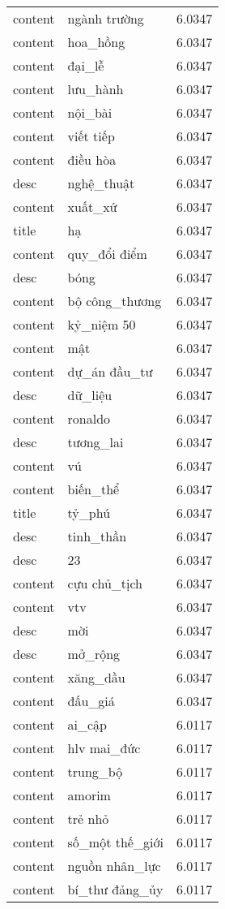 \documentclass{article}
\begin{document}
\begin{tabular}{lll}
content & ngành trường & 6.0347\\
content & hoa\_hồng & 6.0347\\
content & đại\_lễ & 6.0347\\
content & lưu\_hành & 6.0347\\
content & nội\_bài & 6.0347\\
content & viết tiếp & 6.0347\\
content & điều hòa & 6.0347\\
desc & nghệ\_thuật & 6.0347\\
content & xuất\_xứ & 6.0347\\
title & hạ & 6.0347\\
content & quy\_đổi điểm & 6.0347\\
desc & bóng & 6.0347\\
content & bộ công\_thương & 6.0347\\
content & kỷ\_niệm 50 & 6.0347\\
content & mật & 6.0347\\
content & dự\_án đầu\_tư & 6.0347\\
desc & dữ\_liệu & 6.0347\\
content & ronaldo & 6.0347\\
desc & tương\_lai & 6.0347\\
content & vú & 6.0347\\
content & biến\_thể & 6.0347\\
title & tỷ\_phú & 6.0347\\
desc & tinh\_thần & 6.0347\\
desc & 23 & 6.0347\\
content & cựu chủ\_tịch & 6.0347\\
content & vtv & 6.0347\\
desc & mời & 6.0347\\
desc & mở\_rộng & 6.0347\\
content & xăng\_dầu & 6.0347\\
content & đấu\_giá & 6.0347\\
content & ai\_cập & 6.0117\\
content & hlv mai\_đức & 6.0117\\
content & trung\_bộ & 6.0117\\
content & amorim & 6.0117\\
content & trẻ nhỏ & 6.0117\\
content & số\_một thế\_giới & 6.0117\\
content & nguồn nhân\_lực & 6.0117\\
content & bí\_thư đảng\_ủy & 6.0117\\

\end{tabular}
\end{document}
